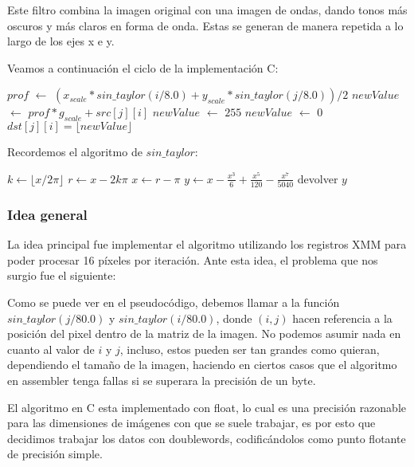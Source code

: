 Este filtro combina la imagen original con una imagen de ondas, dando tonos más oscuros y más claros en forma de onda. Estas se generan de manera repetida a lo largo de los ejes x e y.

Veamos a continuación el ciclo de la implementación C:

\begin{pseudocodigo}
      \STATE $prof$ $\leftarrow$ $(x_{scale} * sin\_taylor(i/8.0) + y_{scale} * sin\_taylor(j/8.0) )/2$ 
      \STATE $newValue$ $\leftarrow$ $prof * g_{scale} + src[j][i]$ 
        \STATE $newValue$ $\leftarrow$ $255$
      \ELSE 
          \STATE $newValue$ $\leftarrow$ $0$
        \ENDIF 
      \ENDIF
      \STATE $dst[j][i] = \lfloor newValue \rfloor$ 
    \ENDFOR
  \ENDFOR
\end{pseudocodigo}

Recordemos el algoritmo de $sin\_taylor$:

\begin{pseudocodigo}
  \STATE $k \leftarrow \lfloor x / 2\pi \rfloor$
  \STATE $r \leftarrow x - 2k\pi$
  \STATE $x \leftarrow r - \pi$
  \STATE $y \leftarrow x - \frac{x^3}{6} + \frac{x^5}{120} - \frac{x^7}{5040}$
  \STATE devolver $y$
\end{pseudocodigo}


\subsubsection{Idea general}

La idea principal fue implementar el algoritmo utilizando los registros XMM para poder procesar 16 píxeles por iteración. Ante esta idea, el problema que nos surgio fue el siguiente:

Como se puede ver en el pseudocódigo, debemos llamar a la función $sin\_taylor(j/80.0)$ y $sin\_taylor(i/80.0)$, donde $(i,j)$ hacen referencia a la posición del pixel dentro de la matriz de la imagen. No podemos asumir nada en cuanto al valor de $i$ y $j$, incluso, estos pueden ser tan grandes como quieran, dependiendo el tamaño de la imagen, haciendo en ciertos casos que el algoritmo en assembler tenga fallas si se superara la precisión de un byte. 

El algoritmo en C esta implementado con float, lo cual es una precisión razonable para las dimensiones de imágenes con que se suele trabajar, es por esto que decidimos trabajar los datos con doublewords, codificándolos como punto flotante de precisión simple.

